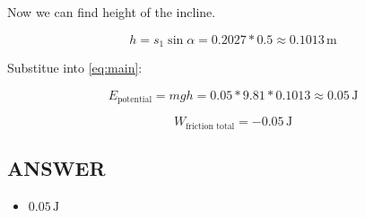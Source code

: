 \bigbreak Now we can find height of the incline.

$$ h = s_1 \sin\alpha = 0.2027 * 0.5 \approx 0.1013 \, \text{m} $$ \smallbreak

Substitue into \ref{eq:main}: 


$$ E_{\text{potential}} = m g h = 0.05 * 9.81 * 0.1013 \approx 0.05 \, \text{J} $$


\[
W_{\text{friction total}} = \boxed{-0.05 \, \text{J}}
\]

\vfill \subsection*{ANSWER}
\begin{itemize}
    \item $0.05 \, \text{J} $
\end{itemize}

